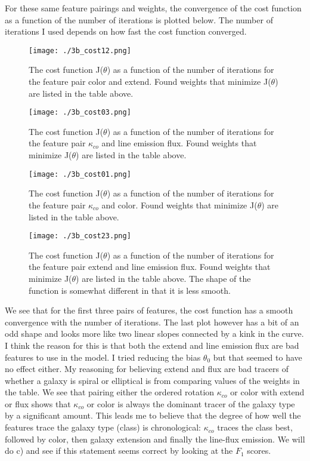 For these same feature pairings and weights, the convergence of the cost function as a function of the number of iterations is plotted below. The number of iterations I used depends on how fast the cost function converged. 

\begin{figure}[h!]
  \centering
  \texttt{[image: ./3b\_cost12.png]}
  \caption{The cost function J($\theta$) as a function of the number of iterations for the feature pair color and extend. Found weights that minimize J($\theta$) are listed in the table above.}
\end{figure}

\begin{figure}[h!]
  \centering
  \texttt{[image: ./3b\_cost03.png]}
  \caption{The cost function J($\theta$) as a function of the number of iterations for the feature pair $\kappa_{co}$ and line emission flux. Found weights that minimize J($\theta$) are listed in the table above.}
\end{figure}

\begin{figure}[h!]
  \centering
  \texttt{[image: ./3b\_cost01.png]}
  \caption{The cost function J($\theta$) as a function of the number of iterations for the feature pair $\kappa_{co}$ and color. Found weights that minimize J($\theta$) are listed in the table above.}
\end{figure}

\begin{figure}[h!]
  \centering
  \texttt{[image: ./3b\_cost23.png]}
  \caption{The cost function J($\theta$) as a function of the number of iterations for the feature pair extend and line emission flux. Found weights that minimize J($\theta$) are listed in the table above. The shape of the function is somewhat different in that it is less smooth.}
\end{figure}

\clearpage

We see that for the first three pairs of features, the cost function has a smooth convergence with the number of iterations. The last plot however has a bit of an odd shape and looks more like two linear slopes connected by a kink in the curve. I think the reason for this is that both the extend and line emission flux are bad features to use in the model. I tried reducing the bias $\theta_0$ but that seemed to have no effect either. My reasoning for believing extend and flux are bad tracers of whether a galaxy is spiral or elliptical is from comparing values of the weights in the table. We see that pairing either the ordered rotation $\kappa_{co}$ or color with extend or flux shows that $\kappa_{co}$ or color is always the dominant tracer of the galaxy type by a significant amount. This leads me to believe that the degree of how well the features trace the galaxy type (class) is chronological: $\kappa_{co}$ traces the class best, followed by color, then galaxy extension and finally the line-flux emission. We will do c) and see if this statement seems correct by looking at the $F_1$ scores. 

